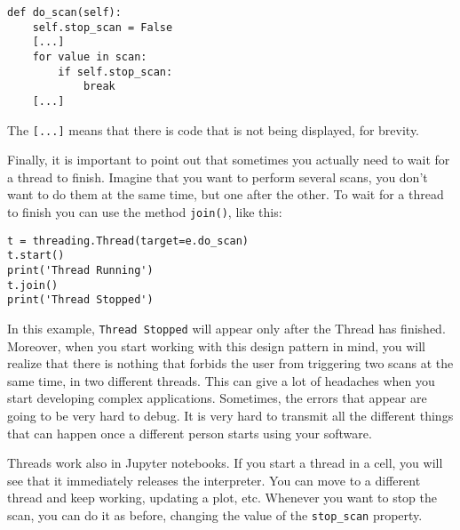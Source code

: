 \begin{verbatim}
def do_scan(self):
    self.stop_scan = False
    [...]
    for value in scan:
        if self.stop_scan:
            break
    [...]
\end{verbatim}

The \texttt{[...]} means that there is code that is not being
displayed, for brevity.



Finally, it is important to point out that sometimes you actually need
to wait for a thread to finish. Imagine that you want to perform several
scans, you don't want to do them at the same time, but one after the
other. To wait for a thread to finish you can use the method
\texttt{join()}, like this:

\begin{verbatim}
t = threading.Thread(target=e.do_scan)
t.start()
print('Thread Running')
t.join()
print('Thread Stopped')
\end{verbatim}

In this example, \texttt{Thread Stopped} will appear only after the
Thread has finished. Moreover, when you start working with this design
pattern in mind, you will realize that there is nothing that forbids the
user from triggering two scans at the same time, in two different
threads. This can give a lot of headaches when you start developing
complex applications. Sometimes, the errors that appear are going to be
very hard to debug. It is very hard to transmit all the different things
that can happen once a different person starts using your software.


Threads work also in Jupyter notebooks. If you start a thread in a cell,
you will see that it immediately releases the interpreter. You can move
to a different thread and keep working, updating a plot, etc. Whenever
you want to stop the scan, you can do it as before, changing the value
of the \texttt{stop_scan} property.

